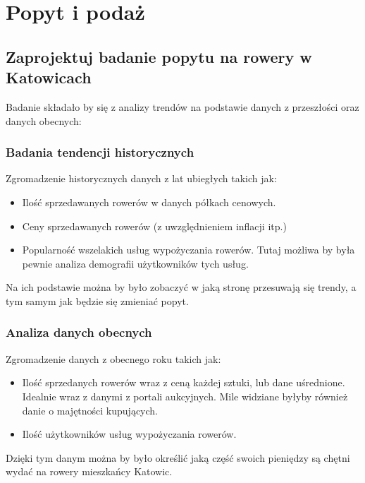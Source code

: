 \documentclass[a4paper,12pt]{article}
\let\oldsection\section
\renewcommand\section{\clearpage\oldsection}
\begin{document}
\section{Popyt i podaż}

\subsection{Zaprojektuj badanie popytu na rowery w Katowicach}

Badanie składało by się z analizy trendów na podstawie danych z przeszłości oraz danych obecnych:

\subsubsection*{Badania tendencji historycznych}

Zgromadzenie historycznych danych z lat ubiegłych takich jak:

\begin{itemize}
	\item Ilość sprzedawanych rowerów w danych półkach cenowych.
	\item Ceny sprzedawanych rowerów (z uwzględnieniem inflacji itp.)
	\item Popularność wszelakich usług wypożyczania rowerów.
	      Tutaj możliwa by była pewnie analiza demografii użytkowników tych usług.
\end{itemize}

Na ich podstawie można by było zobaczyć w jaką stronę przesuwają się trendy, a tym samym jak będzie się zmieniać popyt.

\subsubsection*{Analiza danych obecnych}

Zgromadzenie danych z obecnego roku takich jak:

\begin{itemize}
	\item Ilość sprzedanych rowerów wraz z ceną każdej sztuki, lub dane uśrednione. Idealnie wraz z danymi z portali aukcyjnych. Mile widziane byłyby również danie o majętności kupujących.
	\item Ilość użytkowników usług wypożyczania rowerów.
\end{itemize}

Dzięki tym danym można by było określić jaką część swoich pieniędzy są chętni wydać na rowery mieszkańcy Katowic.
\end{document}
